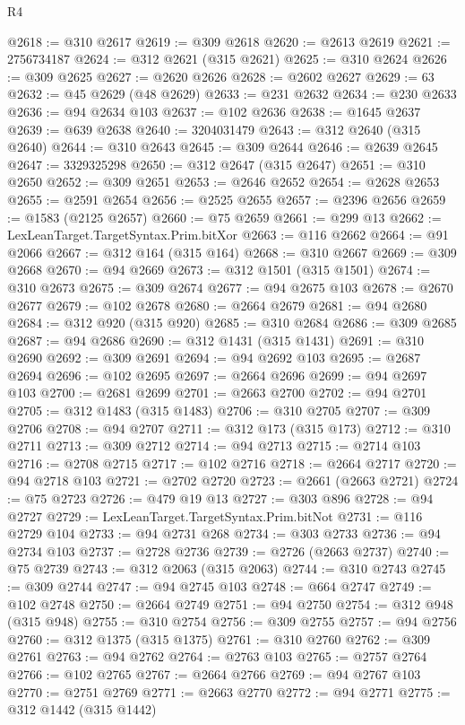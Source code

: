 \begin{lexlean}{R4}
\begin{coremodule}
@2618 := @310 @2617
@2619 := @309 @2618
@2620 := @2613 @2619
@2621 := 2756734187
@2624 := @312 @2621 (@315 @2621)
@2625 := @310 @2624
@2626 := @309 @2625
@2627 := @2620 @2626
@2628 := @2602 @2627
@2629 := 63
@2632 := @45 @2629 (@48 @2629)
@2633 := @231 @2632
@2634 := @230 @2633
@2636 := @94 @2634 @103
@2637 := @102 @2636
@2638 := @1645 @2637
@2639 := @639 @2638
@2640 := 3204031479
@2643 := @312 @2640 (@315 @2640)
@2644 := @310 @2643
@2645 := @309 @2644
@2646 := @2639 @2645
@2647 := 3329325298
@2650 := @312 @2647 (@315 @2647)
@2651 := @310 @2650
@2652 := @309 @2651
@2653 := @2646 @2652
@2654 := @2628 @2653
@2655 := @2591 @2654
@2656 := @2525 @2655
@2657 := @2396 @2656
@2659 := @1583 (@2125 @2657)
@2660 := @75 @2659
@2661 := @299 @13
@2662 := LexLeanTarget.TargetSyntax.Prim.bitXor
@2663 := @116 @2662
@2664 := @91 @2066
@2667 := @312 @164 (@315 @164)
@2668 := @310 @2667
@2669 := @309 @2668
@2670 := @94 @2669
@2673 := @312 @1501 (@315 @1501)
@2674 := @310 @2673
@2675 := @309 @2674
@2677 := @94 @2675 @103
@2678 := @2670 @2677
@2679 := @102 @2678
@2680 := @2664 @2679
@2681 := @94 @2680
@2684 := @312 @920 (@315 @920)
@2685 := @310 @2684
@2686 := @309 @2685
@2687 := @94 @2686
@2690 := @312 @1431 (@315 @1431)
@2691 := @310 @2690
@2692 := @309 @2691
@2694 := @94 @2692 @103
@2695 := @2687 @2694
@2696 := @102 @2695
@2697 := @2664 @2696
@2699 := @94 @2697 @103
@2700 := @2681 @2699
@2701 := @2663 @2700
@2702 := @94 @2701
@2705 := @312 @1483 (@315 @1483)
@2706 := @310 @2705
@2707 := @309 @2706
@2708 := @94 @2707
@2711 := @312 @173 (@315 @173)
@2712 := @310 @2711
@2713 := @309 @2712
@2714 := @94 @2713
@2715 := @2714 @103
@2716 := @2708 @2715
@2717 := @102 @2716
@2718 := @2664 @2717
@2720 := @94 @2718 @103
@2721 := @2702 @2720
@2723 := @2661 (@2663 @2721)
@2724 := @75 @2723
@2726 := @479 @19 @13
@2727 := @303 @896
@2728 := @94 @2727
@2729 := LexLeanTarget.TargetSyntax.Prim.bitNot
@2731 := @116 @2729 @104
@2733 := @94 @2731 @268
@2734 := @303 @2733
@2736 := @94 @2734 @103
@2737 := @2728 @2736
@2739 := @2726 (@2663 @2737)
@2740 := @75 @2739
@2743 := @312 @2063 (@315 @2063)
@2744 := @310 @2743
@2745 := @309 @2744
@2747 := @94 @2745 @103
@2748 := @664 @2747
@2749 := @102 @2748
@2750 := @2664 @2749
@2751 := @94 @2750
@2754 := @312 @948 (@315 @948)
@2755 := @310 @2754
@2756 := @309 @2755
@2757 := @94 @2756
@2760 := @312 @1375 (@315 @1375)
@2761 := @310 @2760
@2762 := @309 @2761
@2763 := @94 @2762
@2764 := @2763 @103
@2765 := @2757 @2764
@2766 := @102 @2765
@2767 := @2664 @2766
@2769 := @94 @2767 @103
@2770 := @2751 @2769
@2771 := @2663 @2770
@2772 := @94 @2771
@2775 := @312 @1442 (@315 @1442)

\end{coremodule}
\end{lexlean}

